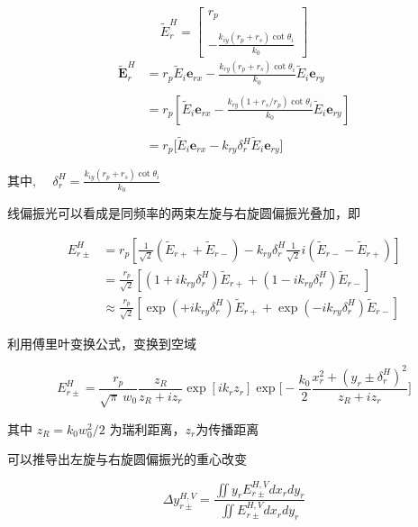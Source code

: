 \documentclass[12pt]{ctexart}
\numberwithin{equation}{section} %
\begin{document}
$$
     \tilde{E}_r^H = 
    \begin{bmatrix} 
        r_p \\ \\
        -\frac{k_{iy} (r_p + r_s) \cot \theta_i}{k_0} 
    \end{bmatrix}
$$
\begin{align*}
    \tilde{\boldsymbol{E}}_{r}^{H}& =r_{p}\tilde{E}_{i}\boldsymbol{e}_{rx}-\frac{k_{ry}(r_{p}+r_{s})\cot\theta_{i}}{k_{0}}\tilde{E}_{i}\boldsymbol{e}_{ry} \\\\
    &=r_{p}\left[\tilde{E}_{i}\boldsymbol{e}_{rx}-\frac{k_{ry}(1+r_{s}/r_{p})\cot\theta_{i}}{k_{0}}\tilde{E}_{i}\boldsymbol{e}_{ry}\right] \\\\
    &=r_{p}\bigg[\tilde{E}_{i}\boldsymbol{e}_{rx}-k_{ry}\delta_{r}^{H}\tilde{E}_{i}\boldsymbol{e}_{ry}\bigg] \\\\
    \end{align*}
$\text{其中, }\quad\delta_r^H=\frac{k_{iy}(r_p+r_s)\cot\theta_i}{k_0}$

线偏振光可以看成是同频率的两束左旋与右旋圆偏振光叠加，即

\begin{align*}
    E_{r\pm}^{H} &= r_{p}\left[\frac{1}{\sqrt{2}}(\tilde{E}_{r+} + \tilde{E}_{r-}) - k_{ry}\delta_{r}^{H}\frac{1}{\sqrt{2}}i(\tilde{E}_{r-} - \tilde{E}_{r+})\right] \\
    &= \frac{r_{p}}{\sqrt{2}}\left[(1 + ik_{ry}\delta_{r}^{H})\tilde{E}_{r+} + (1 - ik_{ry}\delta_{r}^{H})\tilde{E}_{r-}\right] \\
    &\approx \frac{r_{p}}{\sqrt{2}}\left[\exp(+ik_{ry}\delta_{r}^{H})\tilde{E}_{r+} + \exp(-ik_{ry}\delta_{r}^{H})\tilde{E}_{r-}\right]
    \end{align*}

利用傅里叶变换公式，变换到空域

    $$E_{r\pm}^{H}=\frac{r_{p}}{\sqrt{\pi}\:w_{0}}\frac{z_{R}}{z_{R}+iz_{r}}\exp[ik_{r}z_{r}]\exp\biggl[-\frac{k_{0}}{2}\frac{x_{r}^{2}+(y_{r}\pm\delta_{r}^{H})^{2}}{z_{R}+iz_{r}}\biggr]$$
    
    其中 $z_R=k_0w_0^2/2$ 为瑞利距离，$z_r$为传播距离

    可以推导出左旋与右旋圆偏振光的重心改变

    $$\Delta y_{r\pm}^{H,V}=\frac{\iint y_rE_{r\pm}^{H,V}dx_rdy_r}{\iint E_{r\pm}^{H,V}dx_rdy_r} $$
\end{document}
